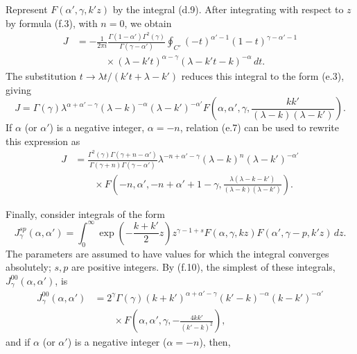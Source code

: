 Represent $F(\alpha',\gamma,k'z)$ by the integral (d.9). After integrating
with respect to $z$ by formula (f.3), with $n=0$, we obtain
\[
 \begin{split}
 J&=-\frac1{2\pi i}\frac{\Gamma(1-\alpha')\Gamma^2(\gamma)}
 {\Gamma(\gamma-\alpha')}\oint_{C'}(-t)^{\alpha'-1}
 (1-t)^{\gamma-\alpha'-1}\\
 &\hspace{3em}\times(\lambda-k't)^{\alpha-\gamma}
 (\lambda-k't-k)^{-\alpha}\,dt.
 \end{split}
\]
The substitution $t\to\lambda t/(k't+\lambda-k')$ reduces this integral to
the form (e.3), giving
\begin{equation}
 J=\Gamma(\gamma)\lambda^{\alpha+\alpha'-\gamma}
 (\lambda-k)^{-\alpha}(\lambda-k')^{-\alpha'}
 F\left(\alpha,\alpha',\gamma,
 \frac{kk'}{(\lambda-k)(\lambda-k')}\right).
 \tag{f.10}
\end{equation}
If $\alpha$ (or $\alpha'$) is a negative integer, $\alpha=-n$, relation
(e.7) can be used to rewrite this expression as
\begin{equation}
 \begin{split}
 J&=\frac{\Gamma^2(\gamma)\Gamma(\gamma+n-\alpha')}
 {\Gamma(\gamma+n)\Gamma(\gamma-\alpha')}
 \lambda^{-n+\alpha'-\gamma}(\lambda-k)^n
 (\lambda-k')^{-\alpha'}\\
 &\hspace{2em}\times F\left(-n,\alpha',-n+\alpha'+1-\gamma,
 \frac{\lambda(\lambda-k-k')}{(\lambda-k)(\lambda-k')}\right).
 \end{split}
 \tag{f.11}
\end{equation}

Finally, consider integrals of the form
\begin{equation}
 J_\gamma^{sp}(\alpha,\alpha')=\int_0^\infty
 \exp\left(-\frac{k+k'}2z\right)z^{\gamma-1+s}
 F(\alpha,\gamma,kz)F(\alpha',\gamma-p,k'z)\,dz.
 \tag{f.12}
\end{equation}
The parameters are assumed to have values for which the integral converges
absolutely; $s,p$ are positive integers. By (f.10), the simplest of these
integrals, $J_\gamma^{00}(\alpha,\alpha')$, is
\begin{equation}
 \begin{split}
 J_\gamma^{00}(\alpha,\alpha')
 &=2^\gamma\Gamma(\gamma)(k+k')^{\alpha+\alpha'-\gamma}
 (k'-k)^{-\alpha}(k-k')^{-\alpha'}\\
 &\hspace{2em}\times F\left(\alpha,\alpha',\gamma,
 -\frac{4kk'}{(k'-k)^2}\right),
 \end{split}
 \tag{f.13}
\end{equation}
and if $\alpha$ (or $\alpha'$) is a negative integer ($\alpha=-n$), then,

